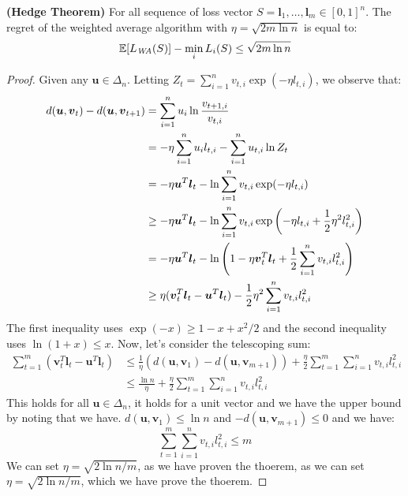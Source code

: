 \begin{theorem}{\textbf{(Hedge Theorem)}}
    For all sequence of loss vector $S = \boldsymbol l_1,\dots,\boldsymbol l_m \in [0, 1]^n$. The regret of the weighted average algorithm with $\eta = \sqrt{2m\ln n}$ is equal to:
    \begin{equation*}
        \mathbb{E}[L_{\text{\emph{WA}}}(S)] - \min_iL_i(S) \le \sqrt{2m\ln n}
    \end{equation*}
\end{theorem}
\begin{proof}
    Given any $\boldsymbol u \in \Delta_n$. Letting $Z_t = \sum^n_{i=1}v_{t, i} \exp(-\eta l_{t, i})$, we observe that:
    \begin{equation*}
    \begin{aligned}
        d(\boldsymbol u, \boldsymbol v_t) - d(\boldsymbol u, \boldsymbol v_{t+1}) &= \sum^n_{i=1}u_i\ln \frac{v_{t+1, i}}{v_{t, i}} \\
        &= -\eta\sum^n_{i=1} u_il_{t,i} - \sum^n_{i=1}u_{t, i}\ln Z_t \\
        &= -\eta \boldsymbol u^T\boldsymbol l_t - \ln\sum^n_{i=1}v_{t, i}\exp(-\eta l_{t, i}) \\
        &\ge -\eta \boldsymbol u^T\boldsymbol l_t - \ln\sum^n_{i=1}v_{t, i}\exp\left( -\eta l_{t, i} + \frac{1}{2}\eta^2l^2_{t, i} \right) \\
        &= -\eta \boldsymbol u^T\boldsymbol l_t - \ln\left( 1 - \eta\boldsymbol v_t^T\boldsymbol l_t + \frac{1}{2}\sum^n_{i=1}v_{t, i}l^2_{t, i} \right) \\
        &\ge \eta(\boldsymbol v_t^T\boldsymbol l_t - \boldsymbol u^T\boldsymbol l_t) - \frac{1}{2}\eta^2\sum^n_{i=1}v_{t, i}l^2_{t, i}
    \end{aligned}
    \end{equation*}
    The first inequality uses $\exp(-x) \ge 1-x+x^2/2$ and the second inequality uses $\ln(1+x) \le x$. Now, let's consider the telescoping sum:
    \begin{equation*}
    \begin{aligned}
        \sum^m_{t=1} (\boldsymbol v_t^T\boldsymbol l_t - \boldsymbol u^T\boldsymbol l_t) &\le \frac{1}{\eta}(d(\boldsymbol u, \boldsymbol v_1) - d(\boldsymbol u, \boldsymbol v_{m+1})) + \frac{\eta}{2}\sum^m_{t=1}\sum^n_{i=1}v_{t, i}l^2_{t, i} \\
        &\le \frac{\ln n}{\eta} + \frac{\eta}{2}\sum^m_{t=1}\sum^n_{i=1}v_{t, i}l^2_{t, i} 
    \end{aligned}
    \end{equation*}
    This holds for all $\boldsymbol u \in \Delta_n$, it holds for a unit vector and we have the upper bound by noting that we have. $d(\boldsymbol u, \boldsymbol v_1) \le \ln n$ and $-d(\boldsymbol u, \boldsymbol v_{m+1})\le0$ and we have:
    \begin{equation*}
        \sum^m_{t=1}\sum^n_{i=1}v_{t, i}l^2_{t, i}  \le m
    \end{equation*}
    We can set $\eta = \sqrt{2\ln n/m}$, as we have proven the thoerem, as we can set $\eta = \sqrt{2\ln n/m}$, which we have prove the thoerem.
\end{proof}

